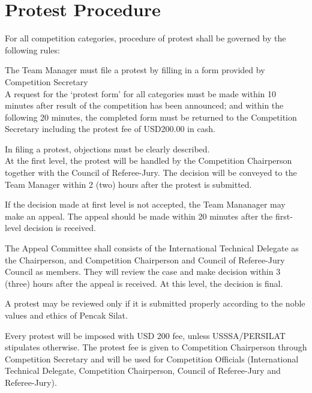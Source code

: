 \section{Protest Procedure}\label{sec:protest_procedure}

For all competition categories, procedure of protest shall be governed by the following rules:
\begin{legal}
\item  The Team Manager must file a protest by filling in a form provided by Competition Secretary\\

A request for the `protest form' for all categories must be made within 10 minutes after result of the competition has been announced; and within the following 20 minutes, the completed form must be returned to the Competition Secretary including the protest fee of USD200.00 in cash.

\item In filing a protest, objections must be clearly described.\\

At the first level, the protest will be handled by the Competition Chairperson together with the Council of Referee-Jury. The decision will be conveyed to the Team Manager within 2 (two) hours after the protest is submitted.

\item  If the decision made at first level is not accepted, the Team Mananager may make an appeal. The appeal should be made within 20 minutes after the first-level decision is received.

\item The Appeal Committee shall consists of the International Technical Delegate as the Chairperson, and Competition Chairperson and Council of Referee-Jury Council as members. They will review the case and make decision within 3 (three) hours after the appeal is received. At this level, the decision is final.

\item A protest may be reviewed only if it is submitted properly according to the noble values and ethics of Pencak Silat.

\item  Every protest will be imposed with USD 200 fee, unless USSSA/PERSILAT stipulates otherwise. The protest fee is given to Competition Chairperson through Competition Secretary and will be used for Competition Officials (International Technical Delegate, Competition Chairperson, Council of Referee-Jury and Referee-Jury).
\end{legal}

